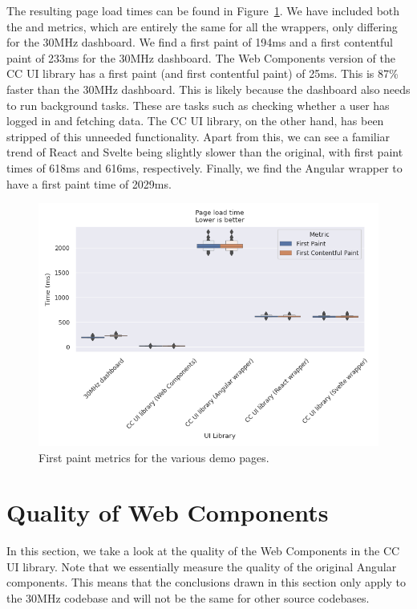 The resulting page load times can be found in Figure~\ref{fig:results:first-paint}. We have included both the  and  metrics, which are entirely the same for all the wrappers, only differing for the 30MHz dashboard. We find a first paint of 194ms and a first contentful paint of 233ms for the 30MHz dashboard. The Web Components version of the CC UI library has a first paint (and first contentful paint) of 25ms. This is 87\% faster than the 30MHz dashboard. This is likely because the dashboard also needs to run background tasks. These are tasks such as checking whether a user has logged in and fetching data. The CC UI library, on the other hand, has been stripped of this unneeded functionality. Apart from this, we can see a familiar trend of React and Svelte being slightly slower than the original, with first paint times of 618ms and 616ms, respectively. Finally, we find the Angular wrapper to have a first paint time of 2029ms.

\begin{figure}[h]
  \includegraphics[width=\columnwidth]{plots/first-contentful-paint.png}
  \caption{First paint metrics for the various demo pages.}
  \label{fig:results:first-paint}
  \centering
\end{figure}

\section{Quality of Web Components}
In this section, we take a look at the quality of the Web Components in the CC UI library. Note that we essentially measure the quality of the original Angular components. This means that the conclusions drawn in this section only apply to the 30MHz codebase and will not be the same for other source codebases.

